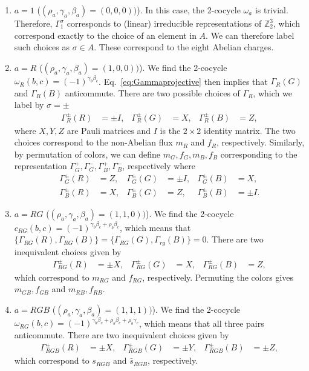 \documentclass[nofootinbib,pra,twocolumn,showpacs,superscriptaddress,notitlepage,amsmath]{revtex4-2} %
\def\ZZ{\mathbb Z}
\begin{document}
\begin{enumerate}
    \item $a=1$ ($(\rho_a,\gamma_a,\beta_a)= (0,0,0))$). In this case, the 2-cocycle $\omega_a$ is trivial. Therefore, $\Gamma^\sigma_1$ corresponds to (linear) irreducible representations of $\ZZ_2^3$, which correspond exactly to the choice of an element in $A$. We can therefore label such choices as $\sigma\in A$. These correspond to the eight Abelian charges.
    \item $a=R$ ($(\rho_a,\gamma_a,\beta_a)= (1,0,0))$). We find the 2-cocycle $\omega_R(b,c) = (-1)^{\gamma_b\beta_c}$. Eq.~\eqref{eq:Gammaprojective} then implies that $\Gamma_R(G)$ and $\Gamma_R(B)$ anticommute. There are two possible choices of $\Gamma_R$, which we label by $\sigma = \pm$
\begin{align}
    \Gamma^{\pm}_R(R) &= \pm I, & \Gamma^{\pm}_R(G) &= X, & \Gamma^{\pm}_R(B) &= Z,
\end{align}
where $X,Y,Z$ are Pauli matrices and $I$ is the $2\times2$ identity matrix. The two choices correspond to the non-Abelian flux $m_R$ and $f_R$, respectively. Similarly, by permutation of colors, we can define $m_G,f_G,m_B,f_B$ corresponding to the representation $\Gamma^+_G,\Gamma^-_G,\Gamma^+_B,\Gamma^-_B$, respectively where
\begin{align}
\Gamma^{\pm}_G(R) &= Z, & \Gamma^{\pm}_G(G) &= \pm I, & \Gamma^{\pm}_G(B) &= X,\label{eq:GammaG}\\
\Gamma^{\pm}_B(R) &= X, & \Gamma^{\pm}_B(G) &= Z, & \Gamma^{\pm}_B(B) &= \pm I.\label{eq:GammaB}
\end{align}
\item  $a=RG$ ($(\rho_a,\gamma_a,\beta_a)= (1,1,0))$). We find the 2-cocycle $c_{RG}(b,c) = (-1)^{\gamma_b\beta_c + \rho_b\beta_c}$, which means that $\{\Gamma_{RG}(R),\Gamma_{RG}(B)\} = \{\Gamma_{RG}(G),\Gamma_{rg}(B)\}=0$. There are two inequivalent choices given by
\begin{align}
    \Gamma^{\pm}_{RG}(R) &= \pm X, & \Gamma^{\pm}_{RG}(G) &= X, & \Gamma^{\pm}_{RG}(B) &= Z,
\end{align}
which correspond to $m_{RG}$ and $f_{RG}$, respectively. Permuting the colors gives $m_{GB},f_{GB}$ and $m_{RB},f_{RB}$.
\item $a=RGB$ ($(\rho_a,\gamma_a,\beta_a)= (1,1,1))$). We find the 2-cocycle $\omega_{RG}(b,c) = (-1)^{\gamma_b\beta_c + \rho_b \beta_c +  \rho_b \gamma_c}$, which means that all three pairs anticommute. There are two inequivalent choices given by
\begin{align}
    \Gamma^{\pm}_{RGB}(R) &= \pm X, & \Gamma^{\pm}_{RGB}(G) &= \pm Y, & \Gamma^{\pm}_{RGB}(B) &= \pm Z,
\end{align}
which correspond to $s_{RGB}$ and $\bar s_{RGB}$, respectively.
\end{enumerate}
\end{document}
